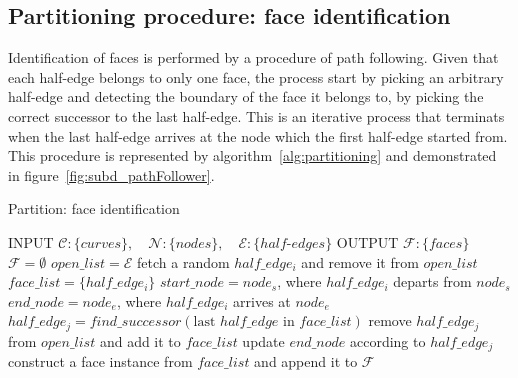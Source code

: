 \subsection{Partitioning procedure: face identification}
Identification of faces is performed by a procedure of path following.
Given that each half-edge belongs to only one face, the process start by picking an arbitrary half-edge and detecting the boundary of the face it belongs to, by picking the correct successor to the last half-edge.
This is an iterative process that terminats when the last half-edge arrives at the node which the first half-edge started from.
This procedure is represented by algorithm~\ref{alg:partitioning} and demonstrated in figure~\ref{fig:subd_pathFollower}.

\begin{algorithm}
  \caption {Partition: face identification}
  \label{alg:partitioning}
  \begin{algorithmic}
    \STATE INPUT  $\mathcal{C}:\{curves\}, \quad \mathcal{N}:\{nodes\}, \quad \mathcal{E}:\{half\text{-}edges\}$
    \STATE OUTPUT  $\mathcal{F}:\{faces\}$
    \STATE \quad
    \STATE $\mathcal{F} = \emptyset$
    \STATE $open\_list = \mathcal{E}$
    \STATE fetch a random $half\_edge_i$ and remove it from $open\_list$
    \STATE $face\_list = \{ half\_edge_i\}$
    \STATE $start\_node = node_s$, where $half\_edge_i$ departs from $node_s$
    \STATE $end\_node = node_e$, where $half\_edge_i$ arrives at $node_e$
    \STATE $half\_edge_j= \mathit{find\_successor} \left( \text{last } half\_edge \text{ in } face\_list \right)$
    \STATE remove $half\_edge_j$ from $open\_list$ and add it to $face\_list$
    \STATE update $end\_node$ according to $half\_edge_j$
    \ENDWHILE
    \STATE construct a face instance from $face\_list$ and append it to $\mathcal{F}$
    \ENDWHILE
  \end{algorithmic}
\end{algorithm}

